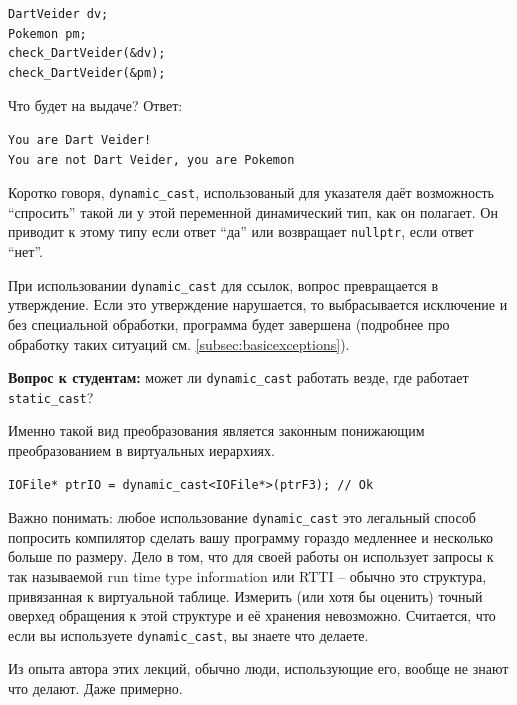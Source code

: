 \documentclass[a4paper,12pt,oneside]{book}
\newif\ifanswers
\begin{document}
\begin{lstlisting}
DartVeider dv;
Pokemon pm;
check_DartVeider(&dv);
check_DartVeider(&pm);
\end{lstlisting}

Что будет на выдаче? Ответ:

\begin{verbatim}
You are Dart Veider!
You are not Dart Veider, you are Pokemon
\end{verbatim}

Коротко говоря, \lstinline!dynamic_cast!, использованый для указателя даёт возможность ``спросить'' такой ли у этой переменной динамический тип, как он полагает. Он приводит к этому типу если ответ ``да'' или возвращает \lstinline!nullptr!, если ответ ``нет''.

При использовании \lstinline!dynamic_cast! для ссылок, вопрос превращается в утверждение. Если это утверждение нарушается, то выбрасывается исключение и без специальной обработки, программа будет завершена (подробнее про обработку таких ситуаций см. \ref{subsec:basicexceptions}).

\textbf{Вопрос к студентам:} может ли \lstinline!dynamic_cast! работать везде, где работает \lstinline!static_cast!?

\ifanswers
Правильный ответ: нет \lstinline!dynamic_cast! очень важно, чтобы в базовом классе была хотя бы одна виртуальная функция -- если таблицы виртуальных методов не будет существовать, динамическое приведение не будет работать.
\fi

Именно такой вид преобразования является законным понижающим преобразованием в виртуальных иерархиях.

\begin{lstlisting}
IOFile* ptrIO = dynamic_cast<IOFile*>(ptrF3); // Ok
\end{lstlisting}

Важно понимать: любое использование \lstinline!dynamic_cast! это легальный способ попросить компилятор сделать вашу программу гораздо медленнее и несколько больше по размеру. Дело в том, что для своей работы он использует запросы к так называемой run time type information или RTTI -- обычно это структура, привязанная к виртуальной таблице. Измерить (или хотя бы оценить) точный оверхед обращения к этой структуре и её хранения невозможно. Считается, что если вы используете \lstinline!dynamic_cast!, вы знаете что делаете.

Из опыта автора этих лекций, обычно люди, использующие его, вообще не знают что делают. Даже примерно.
\end{document}
